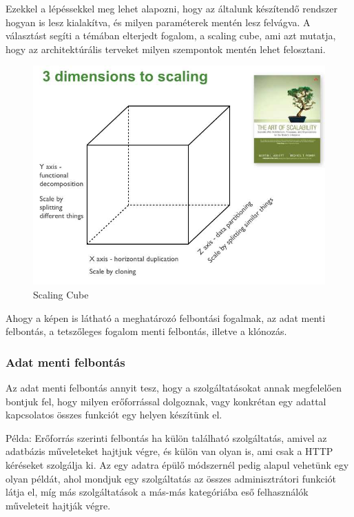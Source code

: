 \documentclass[11pt,magyar,a4paper,twoside,]{report}
\let\Oldincludegraphics\includegraphics
\renewcommand{\includegraphics}[1]{
\begin{adjustbox}{max size={\textwidth}{\textheight}}
    \Oldincludegraphics[scale=0.6]{#1}%
\end{adjustbox}
}
\begin{document}
Ezekkel a lépéssekkel meg lehet alapozni, hogy az általunk készítendő
rendszer hogyan is lesz kialakítva, és milyen paraméterek mentén lesz
felvágva. A választást segíti a témában elterjedt fogalom, a scaling
cube\citep{scale-cube}, ami azt mutatja, hogy az architektúrális
terveket milyen szempontok mentén lehet felosztani.

\begin{figure}[H]
\centering
\includegraphics{img/ScaleCude.jpg}
\caption{Scaling Cube}
\end{figure}

Ahogy a képen is látható a meghatározó felbontási fogalmak, az adat
menti felbontás, a tetszőleges fogalom menti felbontás, illetve a
klónozás.

\subsubsection{Adat menti felbontás}\label{adat-menti-felbontuxe1s}

Az adat menti felbontás annyit tesz, hogy a szolgáltatásokat annak
megfelelően bontjuk fel, hogy milyen erőforrással dolgoznak, vagy
konkrétan egy adattal kapcsolatos összes funkciót egy helyen készítünk
el.

Példa: Erőforrás szerinti felbontás ha külön található szolgáltatás,
amivel az adatbázis műveleteket hajtjuk végre, és külön van olyan is,
ami csak a HTTP kéréseket szolgálja ki. Az egy adatra épülő módszernél
pedig alapul vehetünk egy olyan példát, ahol mondjuk egy szolgáltatás az
összes adminisztrátori funkciót látja el, míg más szolgáltatások a
más-más kategóriába eső felhasználók műveleteit hajtják végre.
\end{document}
